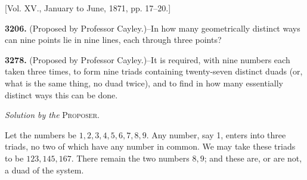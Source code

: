 \documentclass[10pt]{article}
\begin{document}
\begin{center}
[Vol. XV., January to June, 1871, pp. 17--20.]
\end{center}

\noindent
\textbf{3206.} (Proposed by Professor Cayley.)--In how many geometrically
distinct ways can nine points lie in nine lines, each through three points?

\medskip
\noindent
\textbf{3278.} (Proposed by Professor Cayley.)--It is required, with nine
numbers each taken three times, to form nine triads containing twenty-seven
distinct duads (or, what is the same thing, no duad twice), and to find in how
many essentially distinct ways this can be done.

\begin{center}
\emph{Solution by the} \textsc{Proposer}.
\end{center}

\noindent
Let the numbers be $1,2,3,4,5,6,7,8,9$. Any number, say 1, enters into three
triads, no two of which have any number in common. We may take these triads to
be $123,145,167$. There remain the two numbers $8,9$; and these are, or are
not, a duad of the system.
\end{document}
